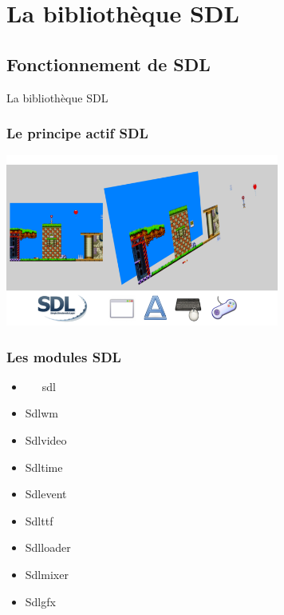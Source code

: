 \section[SDL]{La bibliothèque SDL}

\subsection{Fonctionnement de SDL} %
\begin{frame}
	\begin{center}
		\huge
		La bibliothèque SDL
	\end{center}
\end{frame}

\begin{frame}
	\frametitle{Le principe actif SDL}
	\begin{center}
		\includegraphics[width=9cm]{pics/sdlSurfaces.png}
	\end{center}
\end{frame}

\begin{frame}[fragile]
	\frametitle{Les modules SDL}
	\begin{center}
		\begin{minipage}{0.4\textwidth}
			\begin{itemize}
				\item ~~~sdl
			\end{itemize}
		\end{minipage}
	\end{center}
	\begin{center}
		\begin{minipage}{0.4\textwidth}
			\begin{itemize}
				\item Sdlwm
				\item Sdlvideo
				\item Sdltime
				\item Sdlevent
			\end{itemize}
		\end{minipage}
		\begin{minipage}{0.4\textwidth}
			\begin{itemize}
				\item Sdlttf
				\item Sdlloader
				\item Sdlmixer
				\item Sdlgfx
			\end{itemize}
		\end{minipage}
	\end{center}
\end{frame}

